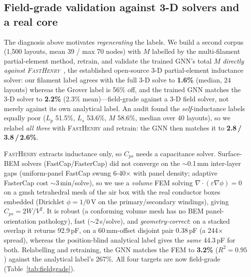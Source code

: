 \documentclass[letterpaper,twocolumn,9pt]{extarticle}
\begin{document}
\subsection{Field-grade validation against 3-D solvers and a real core}
\label{sec:fieldgrade}
The diagnosis above motivates \emph{regenerating} the labels. We build a second
corpus (1{,}500 layouts, mean 39 / max 70 nodes) with $M$ labelled by the
multi-filament partial-element method, retrain, and validate the trained GNN's
total $M$ \emph{directly against \textsc{FastHenry}}~\cite{fasthenry}, the
established open-source 3-D partial-element inductance solver: our filament label
agrees with the full 3-D solve to \textbf{1.6\%} (median, 24 layouts) whereas the
Grover label is 56\% off, and the trained GNN matches the 3-D solver to
\textbf{2.2\%} (2.3\% mean)---field-grade against a 3-D field solver, not merely
against its own analytical label. An audit found the \emph{self}-inductance labels
equally poor ($L_p$ 51.5\%, $L_s$ 53.6\%, $M$ 58.6\%, median over 40 layouts),
so we relabel \emph{all three} with \textsc{FastHenry} and retrain: the GNN then
matches it to \textbf{2.8\,/\,3.8\,/\,2.6\%}.

\textsc{FastHenry} extracts inductance only, so $C_{ps}$ needs a capacitance
solver. Surface-BEM solvers (FastCap/FasterCap) did not converge on the
$\sim$0.1\,mm inter-layer gaps (uniform-panel FastCap swung 6-40$\times$ with
panel density; adaptive FasterCap cost $\sim$3\,min/solve), so we use a
\emph{volume} FEM solving $\nabla\!\cdot\!(\varepsilon\nabla\phi)=0$ on a gmsh
tetrahedral mesh of the air box with the real conductor boxes embedded (Dirichlet
$\phi=1/0$\,V on the primary/secondary windings), giving $C_{ps}=2W/V^2$. It is
robust (a conforming volume mesh has no BEM panel-orientation pathology), fast
($\sim$2\,s/solve), and \emph{geometry-correct}: on a stacked overlap it returns
92.9\,pF, on a 60\,mm-offset disjoint pair 0.38\,pF (a 244$\times$ spread),
whereas the position-blind analytical label gives the \emph{same} 44.3\,pF for
both. Relabelling and retraining, the GNN matches the FEM to \textbf{3.2\%}
($R^2=0.95$) against the analytical label's 267\%. All four targets are now
field-grade (Table~\ref{tab:fieldgrade}).
\end{document}
